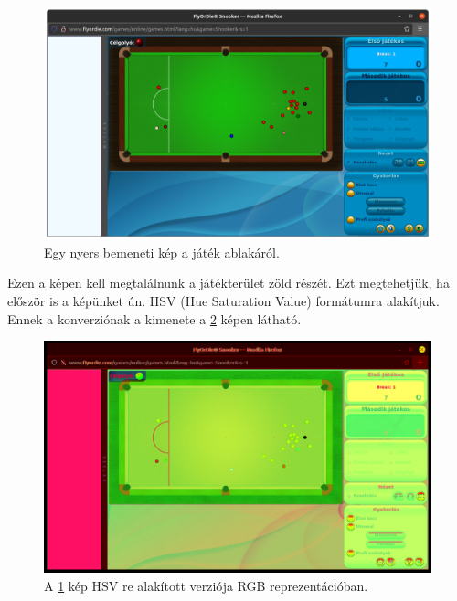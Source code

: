 \begin{figure}[!ht]
    \centering
    \includegraphics[width=150mm, keepaspectratio]{figures/input_screen.png}
    \caption{Egy nyers bemeneti kép a játék ablakáról.}
    \label{fig:bemeneti_kep}
\end{figure}

\par Ezen a képen kell megtalálnunk a játékterület zöld részét. Ezt megtehetjük, ha először is a képünket ún. HSV (Hue Saturation Value) formátumra alakítjuk. Ennek a konverziónak a kimenete a \ref{fig:bemeneti_kep_hsv} képen látható.

\begin{figure}[!ht]
    \centering
    \includegraphics[width=150mm, keepaspectratio]{figures/input_screen_hsv.png}
    \caption{A \ref{fig:bemeneti_kep} kép HSV re alakított verziója RGB reprezentációban.}
    \label{fig:bemeneti_kep_hsv}
\end{figure}

